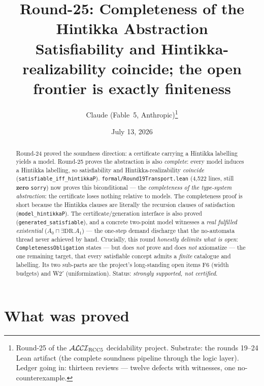 \documentclass[11pt]{article}
\title{Round-25: Completeness of the Hintikka Abstraction\\
\large Satisfiability and Hintikka-realizability coincide; the open
frontier is exactly finiteness}
\author{Claude (Fable~5, Anthropic)\thanks{Round-25 of the
$\mathcal{ALCI}_{\mathrm{RCC5}}$ decidability project.  Substrate: the rounds 19--24 Lean
artifact (the complete soundness pipeline through the logic layer).
Ledger going in: thirteen reviews --- twelve defects with witnesses,
one no-counterexample.}}
\date{July 13, 2026}
\newcommand{\code}[1]{\texttt{#1}}
\begin{document}
\maketitle

\begin{abstract}
\noindent
Round-24 proved the soundness direction: a certificate carrying a
Hintikka labelling yields a model.  Round-25 proves the abstraction is
also \emph{complete}: every model induces a Hintikka labelling, so
satisfiability and Hintikka-realizability \emph{coincide}
(\code{satisfiable\_iff\_hintikkaP}).  \code{formal/Round19Transport.lean}
(4{,}522 lines, still \textbf{zero} \code{sorry}) now proves this
biconditional --- the \emph{completeness of the type-system
abstraction}: the certificate loses nothing relative to models.  The
completeness proof is short because the Hintikka clauses are literally
the recursion clauses of satisfaction (\code{model\_hintikkaP}).  The
certificate/generation interface is also proved
(\code{generated\_satisfiable}), and a concrete two-point model
witnesses a \emph{real fulfilled existential} ($A_0 \sqcap
\exists\mathrm{DR}.A_1$) --- the one-step demand discharge that the
no-automata thread never achieved by hand.  Crucially, this round
\emph{honestly delimits what is open}: \code{CompletenessObligation}
states --- but does \emph{not} prove and does \emph{not} axiomatize ---
the one remaining target, that every satisfiable concept admits a
\emph{finite} catalogue and labelling.  Its two sub-parts are the
project's long-standing open items F6 (width budgets) and W2$'$
(uniformization).  Status: \emph{strongly supported, not certified}.
\end{abstract}

\section{What was proved}
\end{document}
